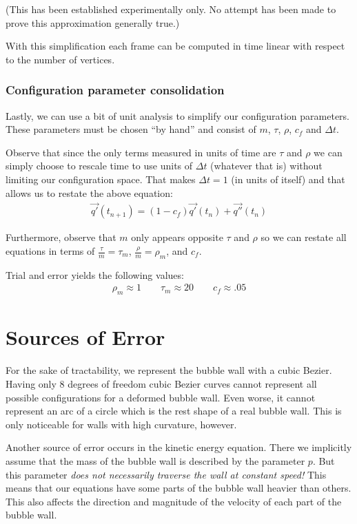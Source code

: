 \documentclass{article}
\begin{document}
(This has been established experimentally only. No attempt has been made to prove this approximation generally true.)

With this simplification each frame can be computed in time linear with respect to the number of vertices.
\subsubsection{Configuration parameter consolidation}
Lastly, we can use a bit of unit analysis to simplify our configuration
parameters. These parameters must be chosen ``by hand'' and consist of $m$,
$\tau$, $\rho$, $c_f$ and $\Delta t$. 

Observe that since the only terms measured in units of time are $\tau$ and
$\rho$ we can simply choose to rescale time to use units of $\Delta t$ 
(whatever that is) without limiting our configuration space. That makes $\Delta
t=1$ (in units of itself) and that allows us to restate the above equation:
\begin{align*}
\vec{q'}(t_{n+1}) = \left(1- c_f\right)\vec{q'}(t_n)+ \vec{q''}(t_n)
\end{align*} 

Furthermore, observe that $m$ only appears opposite $\tau$ and
$\rho$ so we can restate all equations in terms of $\frac{\tau}{m}=\tau_m$,
$\frac{\rho}{m}=\rho_m$, and $c_f$.

Trial and error yields the following values:
\begin{align*}
\rho_m \approx 1 \qquad \tau_m \approx 20 \qquad c_f \approx .05 
\end{align*}
\clearpage
\section{Sources of Error}
For the sake of tractability, we represent the bubble wall with a
cubic Bezier. Having only 8 degrees of freedom cubic Bezier curves cannot
represent all possible configurations for a deformed bubble wall. Even
worse, it cannot represent an arc of a circle which is the rest shape of a real
bubble wall. This is only noticeable for walls with high curvature, however.

Another source of error occurs in the kinetic energy equation. There we
implicitly assume that the mass of the bubble wall is described by the
parameter $p$. But this parameter \emph{does not necessarily
traverse the wall at constant speed!} This means that our equations have some
parts of the bubble wall heavier than others. This also affects
the direction and magnitude of the velocity of each part of the bubble wall.
\end{document}
